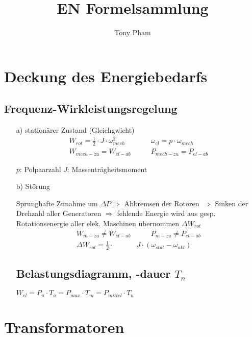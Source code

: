 \documentclass[a4paper,11pt]{article}
\title{EN Formelsammlung}
\author{Tony Pham}
\begin{document}
\maketitle
\tableofcontents
\twocolumn

\section{Deckung des Energiebedarfs}
	\subsection{Frequenz-Wirkleistungsregelung}

	\begin{enumerate}
		\item[a)]{stationärer Zustand (Gleichgwicht)}
		\begin{align*}
			 W_{rot} = \frac{1}{2} \cdot J \cdot \omega_{mech} ^{2} &\qquad
			 \omega_{el} = p  \cdot \omega_{mech} \\
			 W_{mech-zu} = W_{el-ab} &\qquad
			 P_{mech-zu} = P_{el-ab}
		\end{align*}

		$p$: Polpaarzahl \quad
		$J$: Massenträgheitsmoment
		
		\item[b)]{Störung}
		
		Sprunghafte Zunahme um $ \Delta P \Rightarrow$ 
		Abbremsen der Rotoren $\Rightarrow$ Sinken der Drehzahl aller Generatoren
		$\Rightarrow$ fehlende Energie wird aus gesp. Rotationsenergie aller elek.
		Maschinen übernommen $\Delta W_{rot}$
		\begin{align*}
			W_{m-zu} \neq W_{el-ab} &\qquad 
			P_{m-zu} \neq P_{el-ab} \\
			\Delta W_{rot} = \frac{1}{2} \cdot & J \cdot (\omega_{stat} - \omega_{akt})
		\end{align*}
	\subsection{Belastungsdiagramm, -dauer $T_{n}$}
	$W_{el} = P_{n} \cdot T_{a} = P_{max} \cdot T_{m} = P_{mittel} \cdot T_{n}$
	\end{enumerate}

\section{Transformatoren}
\end{document}

